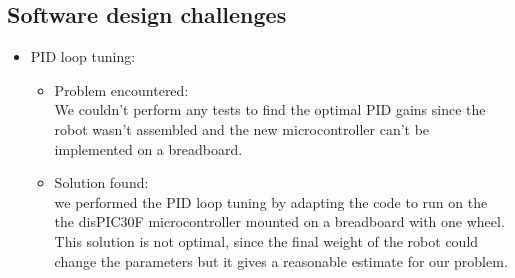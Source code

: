 
\subsection{Software design challenges}
\begin{itemize}
    \item PID loop tuning: 
     \begin{itemize}
      \item Problem encountered:\\
    We couldn’t perform any tests to find the optimal PID gains since the robot wasn’t assembled and the new microcontroller can’t be implemented on a breadboard. 
      \item Solution found:\\
    we performed the PID loop tuning by adapting the code to run on the the disPIC30F microcontroller mounted on a breadboard with one wheel. This solution is not optimal, since the final weight of the robot could change the parameters but it gives a reasonable estimate for our problem. 
        \end{itemize}
\end{itemize}

